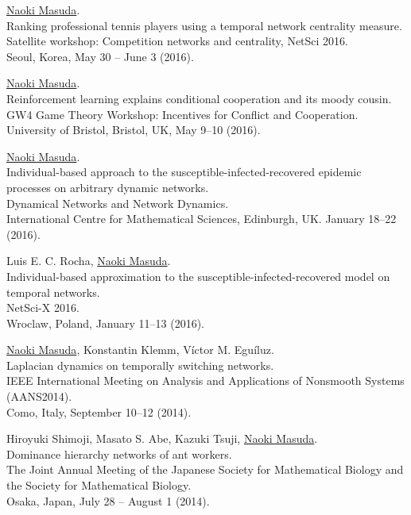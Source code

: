 \documentclass[11pt,letter]{article}
\begin{document}
\begin{etaremune}
\item \underline{Naoki Masuda}.\\
Ranking professional tennis players using a temporal network centrality measure.\\
Satellite workshop: Competition networks and centrality, NetSci 2016.\\
Seoul, Korea, May 30 -- June 3 (2016).

\item \underline{Naoki Masuda}.\\
Reinforcement learning explains conditional cooperation and its moody cousin.\\
GW4 Game Theory Workshop: Incentives for Conflict and Cooperation.\\
University of Bristol, Bristol, UK, May 9--10 (2016).

\item \underline{Naoki Masuda}.\\
Individual-based approach to the susceptible-infected-recovered epidemic processes on arbitrary dynamic networks.\\
Dynamical Networks and Network Dynamics.\\
International Centre for Mathematical Sciences, Edinburgh, UK. January 18--22 (2016).

\item Luis E. C. Rocha, \underline{Naoki Masuda}.\\
Individual-based approximation to the susceptible-infected-recovered model on temporal networks.\\
NetSci-X 2016.\\
Wroclaw, Poland, January 11--13 (2016).

\item \underline{Naoki Masuda}, Konstantin Klemm, V\'{i}ctor M. Egu\'{i}luz.\\
Laplacian dynamics on temporally switching networks.\\
IEEE International Meeting on Analysis and Applications of Nonsmooth Systems (AANS2014).\\
Como, Italy, September 10--12 (2014).

\item Hiroyuki Shimoji, Masato S. Abe, Kazuki Tsuji, \underline{Naoki Masuda}.\\
Dominance hierarchy networks of ant workers.\\
The Joint Annual Meeting of the Japanese Society for Mathematical Biology and the Society for Mathematical Biology.\\
Osaka, Japan, July 28 -- August 1 (2014).


\end{etaremune}
\end{document}
